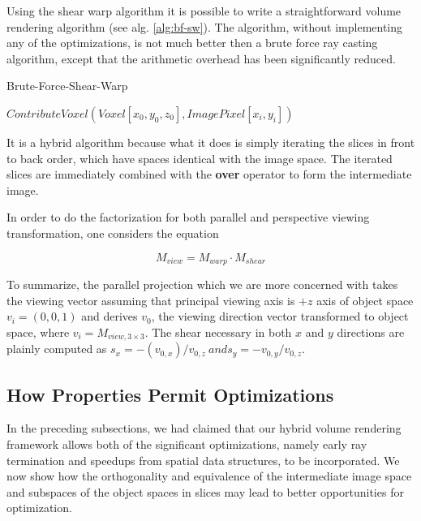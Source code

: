 \documentclass[a4paper,12pt]{article}
\begin{document}
Using the shear warp algorithm it is possible to write a
straightforward volume rendering algorithm (see alg. \ref{alg:bf-sw}).
The algorithm, without implementing any of the optimizations,
is not much better then a brute force ray casting algorithm, except
that the arithmetic overhead has been significantly reduced.

\begin{algorithm}
\caption{Brute-Force-Shear-Warp}
\label{alg:bf-sw}
\begin{algorithmic}
       \STATE
  $ContributeVoxel(Voxel[x_0,y_0,z_0],ImagePixel[x_i,y_i])$ \ENDFOR
  \ENDFOR \ENDFOR \ENDFOR \ENDFOR
\end{algorithmic}
\end{algorithm}

It is a hybrid algorithm because what it does is simply iterating the
slices in front to back order, which have spaces identical with the
image space. The iterated slices are immediately combined with the
\textbf{over} operator to form the intermediate image.

In order to do the factorization for both parallel and perspective
viewing transformation, one considers the equation

\begin{equation}
 M_{view} = M_{warp} \cdot M_{shear}
\end{equation}

To summarize, the parallel projection which we are more concerned with
takes the viewing vector assuming that principal viewing axis is $+z$
axis of object space $v_i = (0,0,1) $ and derives $v_0$, the viewing
direction vector transformed to object space, where $v_i =
M_{{view},{3 \times 3}}$. The shear necessary in both $x$ and $y$
directions are plainly computed as $s_x = -(v_{0,x})/v_{0,z} \ and s_y
= - v_{0,y}/v_{0,z}$.

\subsection{How Properties Permit Optimizations}

In the preceding subsections, we had claimed that our hybrid volume
rendering framework allows both of the significant optimizations,
namely early ray termination and speedups from spatial data
structures, to be incorporated. We now show how the orthogonality and
equivalence of the intermediate image space and subspaces of the
object spaces in slices may lead to better opportunities for
optimization.
\end{document}
